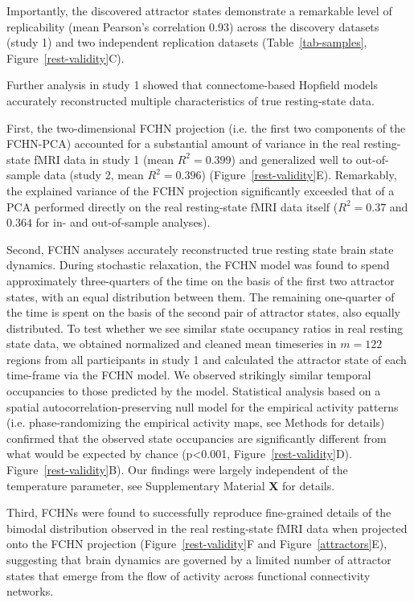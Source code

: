 \documentclass{article}
\begin{document}
Importantly, the discovered attractor states demonstrate a remarkable level of replicability (mean Pearson's
correlation 0.93) across the discovery datasets (study 1) and two independent replication datasets
(Table~\ref{tab-samples}, Figure~\ref{rest-validity}C).

Further analysis in study 1 showed that connectome-based Hopfield models accurately reconstructed multiple
characteristics of true resting-state data.

First, the two-dimensional FCHN projection (i.e. the first two components of the FCHN-PCA) accounted for a substantial amount of variance in the real resting-state fMRI data in study 1 (mean $R^2=0.399$) and generalized well to out-of-sample data (study 2, mean $R^2=0.396$)  (Figure~\ref{rest-validity}E). Remarkably, the explained variance of the FCHN projection significantly exceeded that of a PCA performed directly on the real resting-state fMRI data itself ($R^2=0.37$ and $0.364$ for in- and out-of-sample analyses).

Second, FCHN analyses accurately reconstructed true resting state brain state dynamics. During stochastic relaxation, the FCHN model was found to spend approximately three-quarters of the time on the basis of the first two attractor states, with an equal distribution between them. The remaining one-quarter of the time is spent on the basis of the second pair of attractor states, also equally distributed. To test whether we see similar state occupancy ratios in real resting state data, we obtained normalized and cleaned mean timeseries in $m=122$ regions from all participants in study 1 and calculated
the attractor state of each time-frame via the FCHN model. We observed strikingly similar temporal occupancies to those predicted by the model. Statistical analysis based on a spatial autocorrelation-preserving null model for the empirical activity patterns (i.e. phase-randomizing the empirical activity maps, see Methods for details) confirmed that the observed state occupancies are significantly different from what would be expected by chance (p\textless 0.001, Figure~\ref{rest-validity}D).
Figure~\ref{rest-validity}B). Our findings were largely independent of the temperature parameter, see Supplementary Material \textbf{X} for details.

Third, FCHNs were found to successfully reproduce fine-grained details of the bimodal distribution observed in the real resting-state fMRI data when projected onto the FCHN projection (Figure~\ref{rest-validity}F and Figure~\ref{attractors}E), suggesting that brain dynamics are governed by a limited number of attractor states that emerge from the flow of activity across functional connectivity networks.
\end{document}
